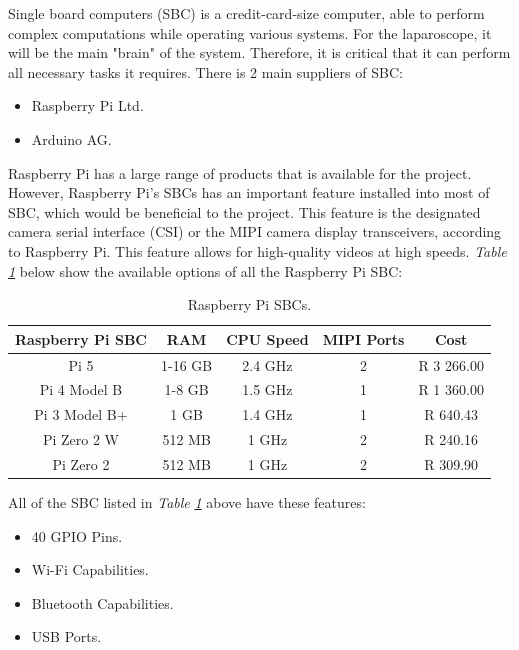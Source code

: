 Single board computers (SBC) is a credit-card-size computer, able to perform complex computations while operating various systems. For the laparoscope, it will be the main "brain" of the system. Therefore, it is critical that it can perform all necessary tasks it requires. There is 2 main suppliers of SBC:
\begin{itemize}
    \item Raspberry Pi Ltd.
    \item Arduino AG.
\end{itemize}

Raspberry Pi has a large range of products that is available for the project. However, Raspberry Pi's SBCs has an important feature installed into most of SBC, which would be beneficial to the project. This feature is the designated camera serial interface (CSI) or the MIPI camera display transceivers, according to Raspberry Pi. This feature allows for high-quality videos at high speeds. \citep{RP-DOC} \textit{Table} \textit{\ref{tab:Raspberry Pi SBC}} below show the available options of all the Raspberry Pi SBC:

\begin{table}[H]
    \centering
    \caption{Raspberry Pi SBCs.\citep{RP-P}}
    \begin{tabular}{|c|c|c|c|c|}
    \hline
        Raspberry Pi SBC & RAM & CPU Speed & MIPI Ports & Cost \\
    \hline
        Pi 5 & 1-16 GB & 2.4 GHz & 2 & R 3 266.00\\
    \hline
        Pi 4 Model B & 1-8 GB & 1.5 GHz & 1 & R 1 360.00\\
    \hline
        Pi 3 Model B+ & 1 GB & 1.4 GHz & 1 & R 640.43\\
    \hline
        Pi Zero 2 W & 512 MB & 1 GHz & 2 & R 240.16 \\ 
    \hline
        Pi Zero 2 & 512 MB & 1 GHz & 2 & R 309.90 \\ 
    \hline
    \end{tabular}
    \label{tab:Raspberry Pi SBC}
\end{table}

All of the SBC listed in \textit{Table} \textit{\ref{tab:Raspberry Pi SBC}} above have these features:

\begin{itemize}
    \item 40 GPIO Pins.
    \item Wi-Fi Capabilities.
    \item Bluetooth Capabilities.
    \item USB Ports.
\end{itemize}

